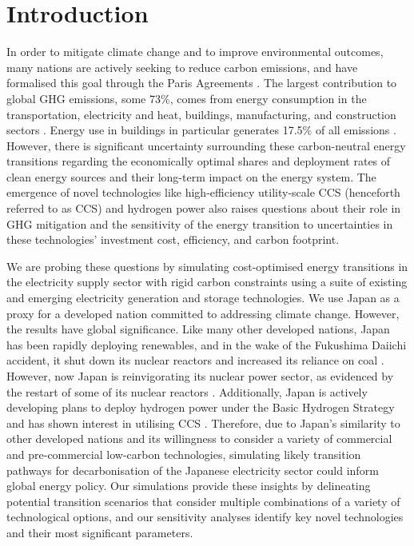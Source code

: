 \section{Introduction} \label{Introduction}
In order to mitigate climate change and to improve environmental outcomes, many nations are actively seeking to reduce carbon emissions, and have formalised this goal through the Paris Agreements \cite{united_nations_framework_convention_on_climate_change_unfccc_submission_2015}. The largest contribution to global \gls{GHG} emissions, some 73\%, comes from energy consumption in the transportation, electricity and heat, buildings, manufacturing, and construction sectors \cite{ge_4_2020}. Energy use in buildings in particular generates 17.5\% of all emissions \cite{ritchie_emissions_2021}. However, there is significant uncertainty surrounding these carbon-neutral energy transitions regarding the economically optimal shares and deployment rates of clean energy sources and their long-term impact on the energy system. The emergence of novel technologies like high-efficiency utility-scale \gls{CCS} (henceforth referred to as \gls{CCS}) and hydrogen power also raises questions about their role in \gls{GHG} mitigation and the sensitivity of the energy transition to uncertainties in these technologies' investment cost, efficiency, and carbon footprint.

We are probing these questions by simulating cost-optimised energy transitions in the electricity supply sector with rigid carbon constraints using a suite of existing and emerging electricity generation and storage technologies. We use Japan as a proxy for a developed nation committed to addressing climate change. However, the results have global significance. Like many other developed nations, Japan has been rapidly deploying renewables, and in the wake of the Fukushima Daiichi accident, it shut down its nuclear reactors \cite{international_energy_agency_latest_2019} and increased its reliance on coal  \cite{noauthor_electricity_2019}. However, now Japan is reinvigorating its nuclear power sector, as evidenced by the restart of some of its nuclear reactors \cite{iaea_pris_nodate}. Additionally, Japan is actively developing plans to deploy hydrogen power under the Basic Hydrogen Strategy \cite{noauthor_basic_2017} and has shown interest in utilising \gls{CCS} \cite{meti_report_2020}. Therefore, due to Japan's similarity to other developed nations and its willingness to consider a variety of commercial and pre-commercial low-carbon technologies, simulating likely transition pathways for decarbonisation of the Japanese electricity sector could inform global energy policy. Our simulations provide these insights by delineating potential transition scenarios that consider multiple combinations of a variety of technological options, and our sensitivity analyses identify key novel technologies and their most significant parameters.

